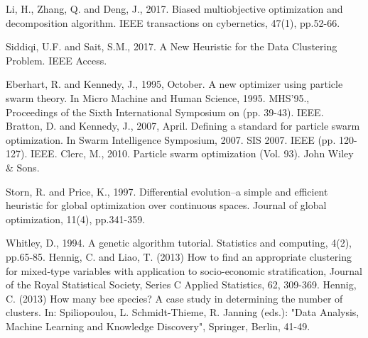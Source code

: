 \documentclass[conference]{IEEEtran}
\begin{document}
\begin{thebibliography}{}
Li, H., Zhang, Q. and Deng, J., 2017. Biased multiobjective optimization and decomposition algorithm. IEEE transactions on cybernetics, 47(1), pp.52-66.

Siddiqi, U.F. and Sait, S.M., 2017. A New Heuristic for the Data Clustering Problem. IEEE Access.

Eberhart, R. and Kennedy, J., 1995, October. A new optimizer using particle swarm theory. In Micro Machine and Human Science, 1995. MHS'95., Proceedings of the Sixth International Symposium on (pp. 39-43). IEEE.
Bratton, D. and Kennedy, J., 2007, April. Defining a standard for particle swarm optimization. In Swarm Intelligence Symposium, 2007. SIS 2007. IEEE (pp. 120-127). IEEE.
Clerc, M., 2010. Particle swarm optimization (Vol. 93). John Wiley \& Sons.


Storn, R. and Price, K., 1997. Differential evolution–a simple and efficient heuristic for global optimization over continuous spaces. Journal of global optimization, 11(4), pp.341-359.

Whitley, D., 1994. A genetic algorithm tutorial. Statistics and computing, 4(2), pp.65-85.
Hennig, C. and Liao, T. (2013) How to find an appropriate clustering for mixed-type variables with application to socio-economic stratification, Journal of the Royal Statistical Society, Series C Applied Statistics, 62, 309-369.
Hennig, C. (2013) How many bee species? A case study in determining the number of clusters. In: Spiliopoulou, L. Schmidt-Thieme, R. Janning (eds.): "Data Analysis, Machine Learning and Knowledge Discovery", Springer, Berlin, 41-49. 


\end{thebibliography}




\end{document}
